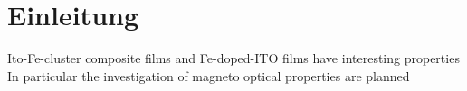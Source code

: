 \chapter{Einleitung}
Ito-Fe-cluster composite films and Fe-doped-ITO films have interesting properties \cite{Peng.2005, Ohno.2007, Shen.2015}
In particular the investigation of magneto optical properties are planned 

